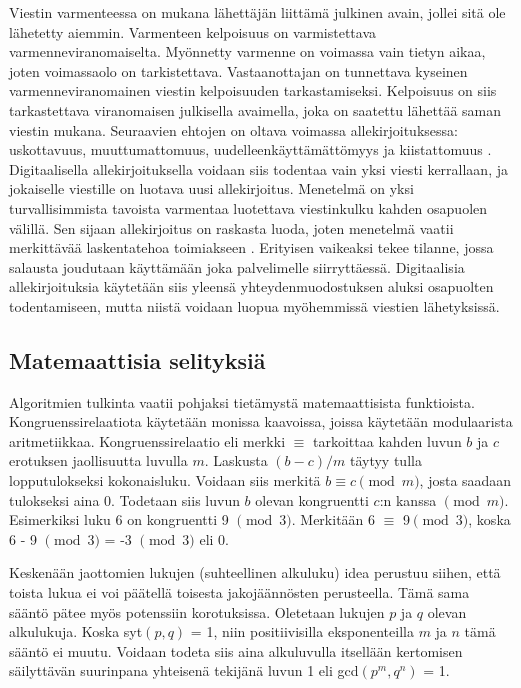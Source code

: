 \documentclass[finnish]{tktltiki2}
\theoremstyle{definition}
\theoremstyle{remark}
\begin{document}
Viestin varmenteessa on mukana lähettäjän liittämä julkinen avain, jollei sitä ole lähetetty aiemmin. Varmenteen kelpoisuus on varmistettava varmenneviranomaiselta. Myönnetty varmenne on voimassa vain tietyn aikaa, joten voimassaolo on tarkistettava. Vastaanottajan on tunnettava kyseinen varmenneviranomainen viestin kelpoisuuden tarkastamiseksi. Kelpoisuus on siis tarkastettava viranomaisen julkisella avaimella, joka on saatettu lähettää saman viestin mukana. Seuraavien ehtojen on oltava voimassa allekirjoituksessa: uskottavuus, muuttumattomuus, uudelleenkäyttämättömyys ja kiistattomuus \cite{e-c}. Digitaalisella allekirjoituksella voidaan siis todentaa vain yksi viesti kerrallaan, ja jokaiselle viestille on luotava uusi allekirjoitus. Menetelmä on yksi turvallisimmista tavoista varmentaa luotettava viestinkulku kahden osapuolen välillä. Sen sijaan allekirjoitus on raskasta luoda, joten menetelmä vaatii merkittävää laskentatehoa toimiakseen \cite{proxy}. Erityisen vaikeaksi tekee tilanne, jossa salausta joudutaan käyttämään joka palvelimelle siirryttäessä. Digitaalisia allekirjoituksia käytetään siis yleensä yhteydenmuodostuksen aluksi osapuolten todentamiseen, mutta niistä voidaan luopua myöhemmissä viestien lähetyksissä.

\subsection{Matemaattisia selityksiä}

Algoritmien tulkinta vaatii pohjaksi tietämystä matemaattisista funktioista. Kongruenssirelaatiota käytetään monissa kaavoissa, joissa käytetään modulaarista aritmetiikkaa. Kongruenssirelaatio eli merkki $\equiv$ tarkoittaa kahden luvun $b$ ja $c$ erotuksen jaollisuutta luvulla $m$. Laskusta $(b - c)/m$ täytyy tulla lopputulokseksi kokonaisluku. Voidaan siis merkitä $b \equiv c \pmod{m}$, josta saadaan tulokseksi aina 0. Todetaan siis luvun $b$ olevan kongruentti $c$:n kanssa $\pmod{m}$. Esimerkiksi luku 6 on kongruentti 9 $\pmod{3}$. Merkitään 6 $\equiv $ 9$ \pmod{3}$, koska 6 - 9 $\pmod{3}$ = -3 $\pmod{3}$ eli 0. \cite{cong}

Keskenään jaottomien lukujen (suhteellinen alkuluku) idea perustuu siihen, että toista lukua ei voi päätellä toisesta jakojäännösten perusteella. Tämä sama sääntö pätee myös potenssiin korotuksissa. Oletetaan lukujen $p$ ja $q$ olevan alkulukuja. Koska syt$(p, q)$ = 1, niin positiivisilla eksponenteilla $m$ ja $n$ tämä sääntö ei muutu. Voidaan todeta siis aina alkuluvulla itsellään kertomisen säilyttävän suurinpana yhteisenä tekijänä luvun 1 eli gcd$(p^m, q^n)$ = 1. \cite{rel}  
\end{document}
